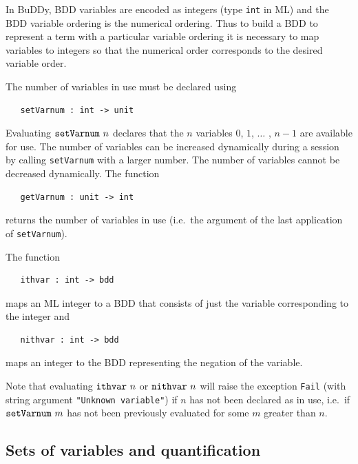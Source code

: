 \documentclass[12pt,fleqn]{article}
\renewcommand{\t}[1]{\mbox{\tt #1}}
\newcommand{\Buddy}{BuDDy{}}
\begin{document}
In \Buddy{}, BDD variables are encoded as integers (type \t{int} in ML) and the BDD variable ordering
is the numerical ordering. Thus to build a BDD to represent a \HOL{} term with a
particular variable ordering it is necessary to map \HOL{} variables to
integers so that the numerical order corresponds to the desired
variable order.

The number of variables in use must be declared using

\begin{verbatim}
   setVarnum : int -> unit
\end{verbatim}

Evaluating $\t{setVarnum}~n$ declares that the $n$ variables $0$,
$1$, $\ldots$ , $n{-}1$ are available for use. The number of variables
can be increased dynamically during a session by calling \t{setVarnum}
with a larger number. The number of variables cannot be decreased
dynamically. The function

\begin{verbatim}
   getVarnum : unit -> int
\end{verbatim}

returns the number of variables in use (i.e.~the argument of the last
application of \t{setVarnum}).

The function

\begin{verbatim}
   ithvar : int -> bdd
\end{verbatim}

maps an ML integer to a BDD that consists of just the variable
corresponding to the integer and

\begin{verbatim}
   nithvar : int -> bdd
\end{verbatim}

maps
an integer to the BDD representing the negation of the variable.

Note that evaluating $\t{ithvar}~n$ or $\t{nithvar}~n$ will raise the exception
\t{Fail} (with string argument \texttt{"Unknown variable"})
if $n$ has not been declared as in use, i.e.~if
$\t{setVarnum}~m$ has not been previously evaluated for some $m$
greater than $n$.


\subsection{Sets of variables and quantification}\label{varSet}
\end{document}
